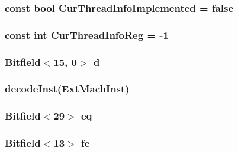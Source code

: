 \label{namespacePowerISA_a1dae322bf8ef83af996e2e1534f3036d}
\hypertarget{namespacePowerISA_a9faf3aac879cfa867d4ae15d4119c45e}{
\subsubsection[{CurThreadInfoImplemented}]{\setlength{\rightskip}{0pt plus 5cm}const bool {\bf CurThreadInfoImplemented} = false}}
\label{namespacePowerISA_a9faf3aac879cfa867d4ae15d4119c45e}
\hypertarget{namespacePowerISA_a7e5bf2f33f34327efc1eeccbb0c1141f}{
\subsubsection[{CurThreadInfoReg}]{\setlength{\rightskip}{0pt plus 5cm}const int {\bf CurThreadInfoReg} = -\/1}}
\label{namespacePowerISA_a7e5bf2f33f34327efc1eeccbb0c1141f}
\hypertarget{namespacePowerISA_a9c78bbf619c2a1c3904cb87c27f375ba}{
\subsubsection[{d}]{\setlength{\rightskip}{0pt plus 5cm}Bitfield$<$15, 0$>$ {\bf d}}}
\label{namespacePowerISA_a9c78bbf619c2a1c3904cb87c27f375ba}
\hypertarget{namespacePowerISA_acff056b9dfcd05748ff37c6a69d9e854}{
\subsubsection[{decodeInst}]{ {\bf decodeInst}(ExtMachInst)}}
\label{namespacePowerISA_acff056b9dfcd05748ff37c6a69d9e854}
\hypertarget{namespacePowerISA_a9d2b59e69f0498a5cc37a71ba578920c}{
\subsubsection[{eq}]{\setlength{\rightskip}{0pt plus 5cm}Bitfield$<$29$>$ {\bf eq}}}
\label{namespacePowerISA_a9d2b59e69f0498a5cc37a71ba578920c}
\hypertarget{namespacePowerISA_ac246f57732ad71b0d35db5adfe68e70d}{
\subsubsection[{fe}]{\setlength{\rightskip}{0pt plus 5cm}Bitfield$<$13$>$ {\bf fe}}}
